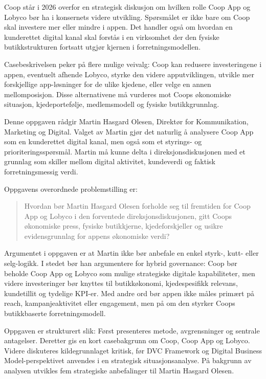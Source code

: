 \documentclass[12pt,a4paper]{article}
\begin{document}
Coop står i 2026 overfor en strategisk diskusjon om hvilken rolle Coop App og Lobyco bør ha i konsernets videre utvikling. Spørsmålet er ikke bare om Coop skal investere mer eller mindre i appen. Det handler også om hvordan en kunderettet digital kanal skal forstås i en virksomhet der den fysiske butikkstrukturen fortsatt utgjør kjernen i forretningsmodellen.

Casebeskrivelsen peker på flere mulige veivalg: Coop kan redusere investeringene i appen, eventuelt afhende Lobyco, styrke den videre apputviklingen, utvikle mer forskjellige app-løsninger for de ulike kjedene, eller velge en annen mellomposisjon. Disse alternativene må vurderes mot Coops økonomiske situasjon, kjedeportefølje, medlemsmodell og fysiske butikkgrunnlag.

Denne oppgaven rådgir Martin Hasgard Olesen, Direktør for Kommunikation, Marketing og Digital. Valget av Martin gjør det naturlig å analysere Coop App som en kunderettet digital kanal, men også som et styrings- og prioriteringsspørsmål. Martin må kunne delta i direksjonsdiskusjonen med et grunnlag som skiller mellom digital aktivitet, kundeverdi og faktisk forretningsmessig verdi.

Oppgavens overordnede problemstilling er:

\begin{quote}
Hvordan bør Martin Hasgard Olesen forholde seg til fremtiden for Coop App og Lobyco i den forventede direksjonsdiskusjonen, gitt Coops økonomiske press, fysiske butikkjerne, kjedeforskjeller og usikre evidensgrunnlag for appens økonomiske verdi?
\end{quote}

Argumentet i oppgaven er at Martin ikke bør anbefale en enkel styrk-, kutt- eller selg-logikk. I stedet bør han argumentere for hybrid governance: Coop bør beholde Coop App og Lobyco som mulige strategiske digitale kapabiliteter, men videre investeringer bør knyttes til butikkøkonomi, kjedespesifikk relevans, kundetillit og tydelige KPI-er. Med andre ord bør appen ikke måles primært på reach, kampanjeaktivitet eller engagement, men på om den styrker Coops butikkbaserte forretningsmodell.

Oppgaven er strukturert slik: Først presenteres metode, avgrensninger og sentrale antagelser. Deretter gis en kort casebakgrunn om Coop, Coop App og Lobyco. Videre diskuteres kildegrunnlaget kritisk, før DVC Framework og Digital Business Model-perspektivet anvendes i en strategisk situasjonsanalyse. På bakgrunn av analysen utvikles fem strategiske anbefalinger til Martin Hasgard Olesen.
\end{document}
